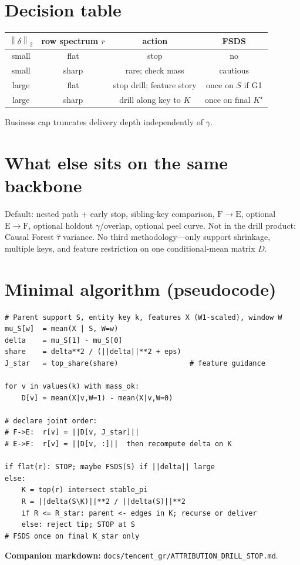 \documentclass[11pt]{article}
\newcommand{\norm}[1]{\left\|#1\right\|_2}
\begin{document}
\section{Decision table}
\label{sec:table}

\begin{center}
\begin{tabular}{@{}cccc@{}}
\toprule
\(\norm{\delta}\) & row spectrum \(r\) & action & FSDS \\
\midrule
small & flat & stop & no \\
small & sharp & rare; check mass & cautious \\
large & flat & stop drill; feature story & once on \(S\) if G1 \\
large & sharp & drill along key to \(K\) & once on final \(K^\star\) \\
\bottomrule
\end{tabular}
\end{center}

\noindent
Business cap truncates delivery depth independently of \(\gamma\).

\section{What else sits on the same backbone}
\label{sec:else}

Default: nested path + early stop, sibling-key comparison,
\(\mathrm{F}\to\mathrm{E}\), optional \(\mathrm{E}\to\mathrm{F}\),
optional holdout \(\gamma\)/overlap, optional peel curve.
Not in the drill product: Causal Forest \(\hat\tau\) variance.
No third methodology---only support shrinkage, multiple keys, and
feature restriction on one conditional-mean matrix \(D\).

\section{Minimal algorithm (pseudocode)}
\label{sec:algo}

\begin{verbatim}
# Parent support S, entity key k, features X (W1-scaled), window W
mu_S[w]  = mean(X | S, W=w)
delta    = mu_S[1] - mu_S[0]
share    = delta**2 / (||delta||**2 + eps)
J_star   = top_share(share)                 # feature guidance

for v in values(k) with mass_ok:
    D[v] = mean(X|v,W=1) - mean(X|v,W=0)

# declare joint order:
# F->E:  r[v] = ||D[v, J_star]||
# E->F:  r[v] = ||D[v, :]||  then recompute delta on K

if flat(r): STOP; maybe FSDS(S) if ||delta|| large
else:
    K = top(r) intersect stable_pi
    R = ||delta(S\K)||**2 / ||delta(S)||**2
    if R <= R_star: parent <- edges in K; recurse or deliver
    else: reject tip; STOP at S
# FSDS once on final K_star only
\end{verbatim}

\vspace{1em}
\noindent\textbf{Companion markdown:}
\texttt{docs/tencent\_gr/ATTRIBUTION\_DRILL\_STOP.md}.
\end{document}
